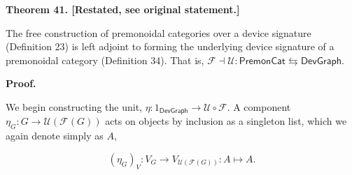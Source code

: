 \documentclass[10pt,a4paper]{article}
\begin{document}
 
 
\par\medskip\noindent\textbf{Theorem 41. [Restated, see original statement.]}\par
 
 
The free construction of premonoidal categories over a device signature (Definition 23) is left adjoint to forming the underlying device signature of a premonoidal category (Definition 34). That is, $\mathcal{F}\dashv\mathcal{U}:\mathsf{PremonCat}\leftrightarrows\mathsf{DevGraph}.$\par
 
 
 
 
 
 
\par\medskip\noindent\textbf{Proof.}\par
 
 
We begin constructing the unit, $\eta:1_{\mathsf{DevGraph}}\to\mathcal{U}\circ\mathcal{F}$. A component $\eta_{G}:G\to\mathcal{U}(\mathcal{F}(G))$ acts on objects by inclusion as a singleton list, which we again denote simply as $A$,\par
    \[(\eta_{G})_{V}:V_{G}\to V_{\mathcal{U}(\mathcal{F}(G))}:A\mapsto A.\]    
 
 
\end{document}
